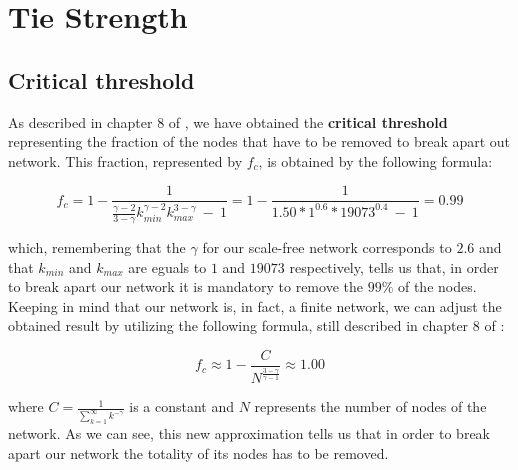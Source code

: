 \chapter{Tie Strength} %
\label{cha:tie_strength}
    \section{Critical threshold} %
    \label{sec:critical_threshold}
        As described in chapter 8 of \cite{network_science}, we have obtained the \textbf{critical threshold}
        representing the fraction of the nodes that have to be removed to break apart out network. This fraction,
        represented by $f_c$, is obtained by the following formula:

        \begin{equation*}
            f_c = 1 - \frac{1}
            {\frac{\gamma - 2}{3 - \gamma}k^{\gamma - 2}_{\mathit{min}}k^{3 - \gamma}_{\mathit{max}} \ - \  1} =
            1 - \frac{1}{1.50 * 1^{0.6} * 19073^{0.4} \ - \ 1} = 0.99
        \end{equation*}

    which, remembering that the $\gamma$ for our scale-free network corresponds to $2.6$ and that $k_{\mathit{min}}$
    and $k_{\mathit{max}}$ are eguals to $1$ and $19073$ respectively, tells us that, in order to break apart our
    network it is mandatory to remove the $99\%$ of the nodes. Keeping in mind that our network is, in fact, a finite
    network, we can adjust the obtained result by utilizing the following formula, still described in chapter 8 of
    \cite{network_science}:

    \begin{equation*}
        f_c \approx 1 - \frac{C}{N^{\frac{3 - \gamma}{\gamma - 1}}} \approx 1.00
    \end{equation*}

    where $C = \frac{1}{\sum_{k=1}^{\infty}k^{-\gamma}}$ is a constant and $N$ represents the number of nodes of the
    network. As we can see, this new approximation tells us that in order to break apart our network the totality of
    its nodes has to be removed.
